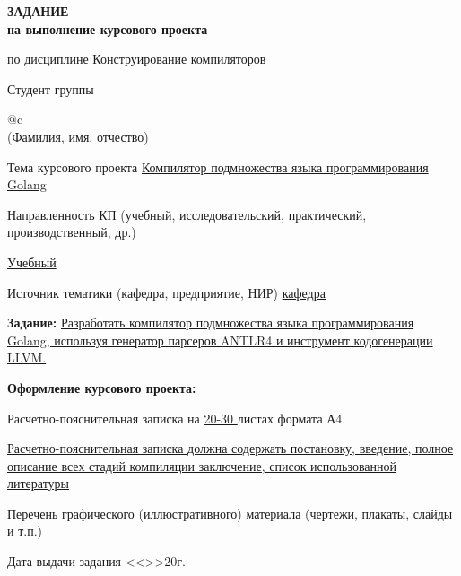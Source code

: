 \begin{titlepage}
    \vfill

    \begin{center}
        \fontsize{16pt}{0.6\baselineskip}\selectfont

        \textbf{ЗАДАНИЕ \\ на выполнение курсового проекта}
    \end{center}

    \begin{flushleft}
        \fontsize{11pt}{0.4cm}\selectfont
        по дисциплине \uline{\hfill Конструирование компиляторов \hfill}

        Студент группы \uline{}

        \begin{signstabular}[0.5]{@{}c}
            \uline{} \\
            \scriptsize (Фамилия, имя, отчество)
        \end{signstabular}

        Тема курсового проекта \uline{\hfill Компилятор подмножества языка программирования Golang \hfill}

        Направленность КП (учебный, исследовательский, практический, производственный, др.)

        \uline{\hfill Учебный \hfill}

        Источник тематики (кафедра, предприятие, НИР) \uline{\hfill кафедра \hfill}

        \textbf{Задание:} \uline{\hfill Разработать компилятор подмножества языка программирования Golang,
            используя генератор парсеров ANTLR4 и инструмент кодогенерации LLVM.  \hfill}

        \textbf{Оформление курсового проекта:}

        Расчетно-пояснительная записка на \uline{ 20-30 } листах формата А4.

        \uline{\hfill Расчетно-пояснительная записка должна содержать постановку, введение, полное описание всех стадий
        компиляции заключение, список использованной литературы  \hfill}

        Перечень графического (иллюстративного) материала (чертежи, плакаты, слайды и т.п.)

        Дата выдачи задания <<\uline{\mbox{\hspace*{1cm}}}>>\uline{\mbox{\hspace*{4cm}}}20\uline{\mbox{\hspace*{0.8cm}}}г.


\end{flushleft}
\end{titlepage}
